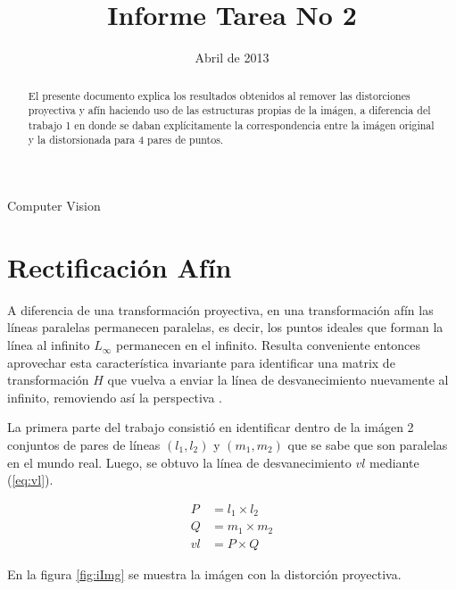 \documentclass{IEEEtran}
\begin{document}
\title{Informe Tarea No 2}
\date {Abril de 2013}
\author{
}
\maketitle


\begin{abstract}
El presente documento explica los resultados obtenidos al remover
las distorciones proyectiva y afín haciendo uso de las
estructuras propias de la imágen, a diferencia del trabajo 1 en
donde se daban explícitamente la correspondencia entre la imágen original
y la distorsionada para 4 pares de puntos.
\end{abstract}

\begin{IEEEkeywords}
Computer Vision
\end{IEEEkeywords}

\section{Rectificación Afín}

A diferencia de una transformación proyectiva, en una transformación afín
las líneas paralelas permanecen paralelas, es decir,
los puntos ideales que forman la línea al infinito $L_{\infty}$
permanecen en el infinito. Resulta conveniente entonces aprovechar esta característica
invariante para identificar una matrix de transformación $H$ que vuelva a enviar
la línea de desvanecimiento nuevamente al infinito, removiendo así la perspectiva 
\cite{hartley2000multiple}.

La primera parte del trabajo consistió en identificar dentro de la imágen 2 conjuntos de 
pares de líneas $(l_1, l_2)$ y $(m_1, m_2)$ que se sabe que son paralelas en el mundo real.
Luego, se obtuvo la línea de desvanecimiento $vl$ mediante (\ref{eq:vl}).

\begin{align}
P &= l_1 \times l_2 \nonumber \\
Q &= m_1 \times m_2 \nonumber \\
vl &= P \times Q
\label{eq:vl}
\end{align} 

En la figura \ref{fig:iImg} se muestra la imágen con la distorción proyectiva.
\end{document}
